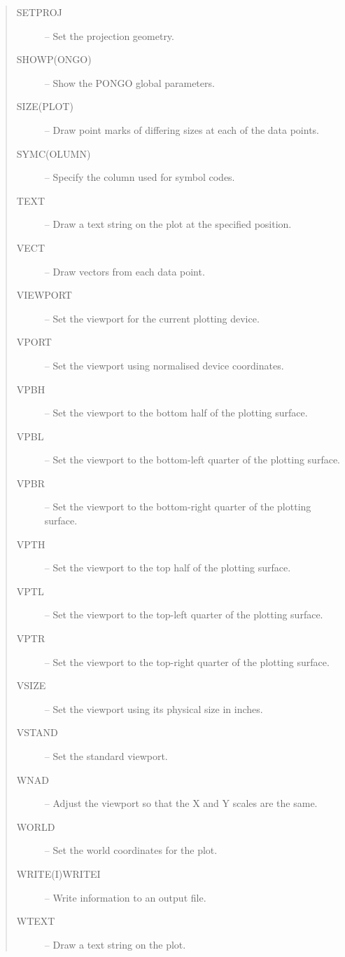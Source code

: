 \documentclass[twoside,11pt]{article}
\newcommand{\htmlref}[2]{#1}
\renewcommand{\_}{\texttt{\symbol{95}}}
\newcommand{\iref} [1]{\htmlref{#1}{#1}}
\newcommand{\iiref}[2]{\htmlref{#1}{#2}}
\begin{document}
\begin {quote}
\begin {description}
\item [\iref{SETPROJ}] -- Set the projection geometry.
\item [\iiref{SHOWP(ONGO)}{SHOWPONGO}] -- Show the PONGO global parameters.
\item [\iiref{SIZE(PLOT)}{SIZEPLOT}] -- Draw point marks of differing
                                        sizes at each of the data points.
\item [\iiref{SYMC(OLUMN)}{SYMCOLUMN}] -- Specify the column used for
                                          symbol codes.
\item [\iref{TEXT}] -- Draw a text string on the plot at the specified
                       position.
\item [\iref{VECT}] -- Draw vectors from each data point.
\item [\iref{VIEWPORT}] -- Set the viewport for the current plotting device.
\item [\iref{VPORT}] -- Set the viewport using normalised device coordinates.
\item [\iref{VP\_BH}] -- Set the viewport to the bottom half of the plotting
                         surface.
\item [\iref{VP\_BL}] -- Set the viewport to the bottom-left quarter of the
                         plotting surface.
\item [\iref{VP\_BR}] -- Set the viewport to the bottom-right quarter of the
                         plotting surface.
\item [\iref{VP\_TH}] -- Set the viewport to the top half of the plotting
                         surface.
\item [\iref{VP\_TL}] -- Set the viewport to the top-left quarter of the
                         plotting surface.
\item [\iref{VP\_TR}] -- Set the viewport to the top-right quarter of the
                         plotting surface.
\item [\iref{VSIZE}] -- Set the viewport using its physical size in inches.
\item [\iref{VSTAND}] -- Set the standard viewport.
\item [\iref{WNAD}] -- Adjust the viewport so that the X and Y scales are the
                       same.
\item [\iref{WORLD}] -- Set the world coordinates for the plot.
\item [\iref{WRITE(I)}{WRITEI}] -- Write information to an output file.
\item [\iref{WTEXT}] -- Draw a text string on the plot.

\end{description}
\end{quote}
\end{document}
